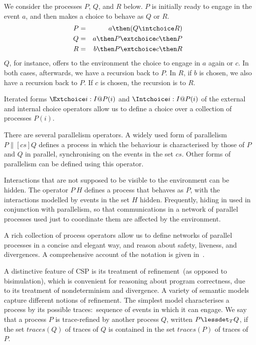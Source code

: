 \begin{example}
  We consider the processes $P$, $Q$, and $R$ below. $P$ is initially
  ready to engage in the event $a$, and then makes a choice to
  behave as $Q$ or $R$.
  \begin{eqnarray*}
  P & = & a \then (Q\intchoice R)
  \\
  Q & = & a \then P \extchoice c \then P
  \\
  R & = & b \then P \extchoice c \then R
  \end{eqnarray*}
  $Q$, for instance, offers to the environment the choice to engage in $a$
  again or $c$. In both cases, afterwards, we have a recursion back to $P$.
  In $R$, if $b$ is chosen, we also have a recursion back to $P$. If $c$ is
  chosen, the recursion is to $R$.
  \xbox
\end{example}
%
Iterated forms $\Extchoice i: I @ P(i)$ and $\Intchoice i: I @ P(i)$ of the
external and internal choice operators allow us to define a choice over a
collection of processes $P(i)$.

There are several parallelism operators. A widely used form of parallelism $P
\parallel[cs] Q$ defines a process in which the behaviour is characterised by
those of $P$ and $Q$ in parallel, synchronising on the events in the set
$cs$. Other forms of parallelism can be defined using this operator.

Interactions that are not supposed to be visible to the environment can be
hidden. The operator $P \ H$ defines a process that behaves as $P$, with the
interactions modelled by events in the set $H$ hidden. Frequently, hiding in
used in conjunction with parallelism, so that communications in a network of
parallel processes used just to coordinate them are affected
by the environment.

A rich collection of process operators allow us to define networks of
parallel processes in a concise and elegant way, and reason about safety,
liveness, and divergences.  A comprehensive account of the notation is given
in~\cite{Roscoe2010}.

A distinctive feature of CSP is its treatment of refinement~(as opposed to
bisimulation), which is convenient for reasoning about program correctness,
due to its treatment of nondeterminism and divergence.  A variety of semantic
models capture different notions of refinement. The simplest model
characterises a process by its possible traces:~sequence of events in which
it can engage.  We say that a process $P$ is trace-refined by another process
$Q$, written $P \lessdet_T Q$, if the set $traces(Q)$ of traces of $Q$ is
contained in the set $traces(P)$ of traces of $P$.

